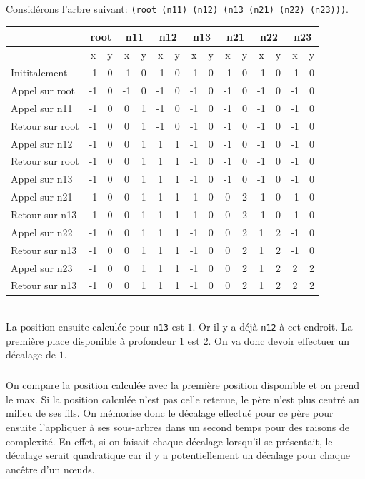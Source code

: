 \subparagraph{} Considérons l'arbre suivant: \verb|(root (n11) (n12) (n13 (n21) (n22) (n23)))|. \\
\begin{tabular}{|l|c|c|c|c|c|c|c|c|c|c|c|c|c|c|}
	\hline
	 & \multicolumn{2}{|c|}{root} & \multicolumn{2}{|c|}{n11} & \multicolumn{2}{|c|}{n12} & \multicolumn{2}{|c|}{n13} & \multicolumn{2}{|c|}{n21} & \multicolumn{2}{|c|}{n22} & \multicolumn{2}{|c|}{n23}\\ \hline
	& x & y & x & y & x & y & x & y & x & y & x & y & x & y \\ \hline
	Inititalement & -1 & 0 & -1 & 0 & -1 & 0 & -1 & 0 & -1 & 0 & -1 & 0 & -1 & 0 \\ \hline
	Appel sur root & -1 & 0 & -1 & 0 & -1 & 0 & -1 & 0 & -1 & 0 & -1 & 0 & -1 & 0 \\ \hline
	Appel sur n11 & -1 & 0 & 0 & 1 & -1 & 0 & -1 & 0 & -1 & 0 & -1 & 0 & -1 & 0 \\ \hline
	Retour sur root & -1 & 0 & 0 & 1 & -1 & 0 & -1 & 0 & -1 & 0 & -1 & 0 & -1 & 0 \\ \hline
	Appel sur n12 & -1 & 0 & 0 & 1 & 1 & 1 & -1 & 0 & -1 & 0 & -1 & 0 & -1 & 0 \\ \hline
	Retour sur root & -1 & 0 & 0 & 1 & 1 & 1 & -1 & 0 & -1 & 0 & -1 & 0 & -1 & 0 \\ \hline
	Appel sur n13 & -1 & 0 & 0 & 1 & 1 & 1 & -1 & 0 & -1 & 0 & -1 & 0 & -1 & 0 \\ \hline
	Appel sur n21 & -1 & 0 & 0 & 1 & 1 & 1 & -1 & 0 & 0 & 2 & -1 & 0 & -1 & 0 \\ \hline
	Retour sur n13 & -1 & 0 & 0 & 1 & 1 & 1 & -1 & 0 & 0 & 2 & -1 & 0 & -1 & 0 \\ \hline
	Appel sur n22 & -1 & 0 & 0 & 1 & 1 & 1 & -1 & 0 & 0 & 2 & 1 & 2 & -1 & 0 \\ \hline
	Retour sur n13 & -1 & 0 & 0 & 1 & 1 & 1 & -1 & 0 & 0 & 2 & 1 & 2 & -1 & 0 \\ \hline
	Appel sur n23 & -1 & 0 & 0 & 1 & 1 & 1 & -1 & 0 & 0 & 2 & 1 & 2 & 2 & 2 \\ \hline
	Retour sur n13 & -1 & 0 & 0 & 1 & 1 & 1 & -1 & 0 & 0 & 2 & 1 & 2 & 2 & 2 \\ \hline
\end{tabular}\\
La position ensuite calculée pour \verb|n13| est $1$. Or il y a déjà \verb|n12| à cet endroit. La première place disponible à profondeur $1$ est $2$. On va donc devoir effectuer un décalage de $1$.

\subparagraph{}On compare la position calculée avec la première position disponible et on prend le max. Si la position calculée n'est pas celle retenue, le père n'est plus centré au milieu de ses fils. On mémorise donc le décalage effectué pour ce père pour ensuite l'appliquer à ses sous-arbres dans un second temps pour des raisons de complexité. En effet, si on faisait chaque décalage lorsqu'il se présentait, le décalage serait quadratique car il y a potentiellement un décalage pour chaque ancêtre d'un n\oe uds.
	
